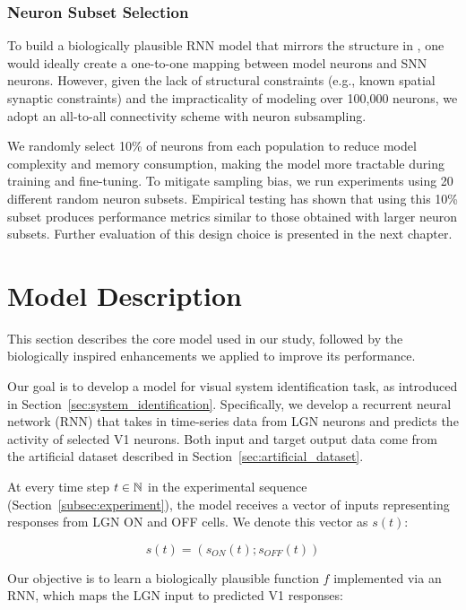\subsubsection{Neuron Subset Selection}
\label{subsubsec:subset_selection}

To build a biologically plausible RNN model that mirrors the structure in \citet{antolik2024comprehensive}, one would ideally create a one-to-one mapping between model neurons and SNN neurons. However, given the lack of structural constraints (e.g., known spatial synaptic constraints) and the impracticality of modeling over 100,000 neurons, we adopt an all-to-all connectivity scheme with neuron subsampling.

We randomly select 10\% of neurons from each population to reduce model complexity and memory consumption, making the model more tractable during training and fine-tuning. To mitigate sampling bias, we run experiments using 20 different random neuron subsets. Empirical testing has shown that using this 10\% subset produces performance metrics similar to those obtained with larger neuron subsets. Further evaluation of this design choice is presented in the next chapter.

\section{Model Description}
\label{sec:model_description}

This section describes the core model used in our study, followed by the biologically inspired enhancements we applied to improve its performance.

Our goal is to develop a model for visual system identification task, as introduced in Section~\ref{sec:system_identification}. Specifically, we develop a recurrent neural network (RNN) that takes in time-series data from LGN neurons and predicts the activity of selected V1 neurons. Both input and target output data come from the artificial dataset described in Section~\ref{sec:artificial_dataset}.

At every time step $t \in \mathbb{N}$ in the experimental sequence (Section~\ref{subsec:experiment}), the model receives a vector of inputs representing responses from LGN ON and OFF cells. We denote this vector as $s(t)$:

\begin{equation*}
    s(t) = \left(s_{ON}(t); s_{OFF}(t)\right)
\end{equation*}

Our objective is to learn a biologically plausible function $f$ implemented via an RNN, which maps the LGN input to predicted V1 responses:

